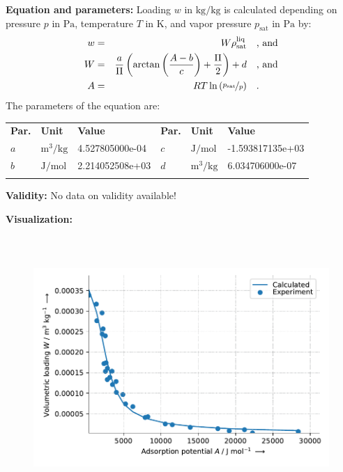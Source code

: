 \textbf{Equation and parameters:}
\newline
%
Loading $w$ in $\si{\kilogram\per\kilogram}$ is calculated depending on pressure $p$ in $\si{\pascal}$, temperature $T$ in $\si{\kelvin}$, and vapor pressure $p_\mathrm{sat}$ in $\si{\pascal}$ by:
%
\begin{equation*}
\begin{split}
w &=& W \rho_\mathrm{sat}^{\mathrm{liq}} & \quad\text{, and} \\
W &=& \frac{a}{\Pi} \left( \arctan \left( \frac{A - b}{c} \right) + \frac{\Pi}{2}\right) + d & \quad\text{, and} \\
A &=& R T \ln \left( \nicefrac{p_\mathrm{sat}}{p} \right) & \quad\text{.} \\
\end{split}
\end{equation*}
%
The parameters of the equation are:
%
\begin{longtable}[l]{lll|lll}
\toprule
\addlinespace
\textbf{Par.} & \textbf{Unit} & \textbf{Value} &	\textbf{Par.} & \textbf{Unit} & \textbf{Value} \\
\addlinespace
\midrule
\endhead

\bottomrule
\endfoot
\bottomrule
\endlastfoot
\addlinespace

$a$ & $\si{\cubic\meter\per\kilogram}$ & 4.527805000e-04 & $c$ & $\si{\joule\per\mole}$ & -1.593817135e+03 \\
$b$ & $\si{\joule\per\mole}$ & 2.214052508e+03 & $d$ & $\si{\cubic\meter\per\kilogram}$ & 6.034706000e-07 \\

\addlinespace\end{longtable}

\textbf{Validity:}
\newline
No data on validity available!
\newline

\textbf{Visualization:}
%
\begin{figure}[!htp]
{\noindent\includegraphics[height=10cm, keepaspectratio]{figs/ads/ads_Water_silica_gel_pellet_125_DubininArctan1_1.pdf}}
\end{figure}
%

